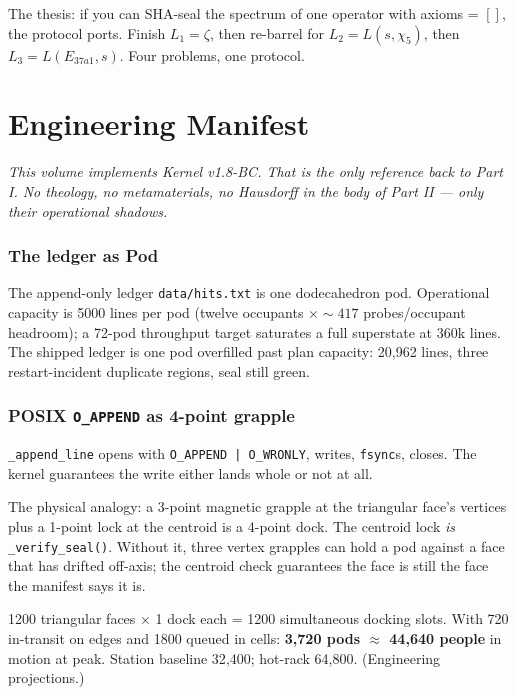 \documentclass[11pt,letterpaper]{article}
\begin{document}
The thesis: if you can SHA-seal the spectrum of one operator with axioms = $[]$, the protocol ports. Finish $L_1 = \zeta$, then re-barrel for $L_2 = L(s, \chi_5)$, then $L_3 = L(E_{37a1}, s)$. Four problems, one protocol.

\clearpage
\part{Engineering Manifest}
\label{part:engineering}

\textit{This volume implements Kernel v1.8-BC. That is the only reference
back to Part I. No theology, no metamaterials, no Hausdorff in the body
of Part II --- only their operational shadows.}

\section{The ledger as Pod}
\label{sec:ledger-pod}

The append-only ledger \texttt{data/hits.txt} is one dodecahedron pod.
Operational capacity is 5000 lines per pod (twelve occupants
$\times {\sim}417$ probes/occupant headroom); a 72-pod throughput target
saturates a full superstate at 360k lines. The shipped ledger is one
pod overfilled past plan capacity: 20,962 lines, three restart-incident
duplicate regions, seal still green.

\section{POSIX \texttt{O\_APPEND} as 4-point grapple}
\label{sec:grapple}

\texttt{\_append\_line} opens with \texttt{O\_APPEND | O\_WRONLY}, writes,
\texttt{fsync}s, closes. The kernel guarantees the write either lands
whole or not at all.

The physical analogy: a 3-point magnetic grapple at the triangular face's
vertices plus a 1-point lock at the centroid is a 4-point dock. The
centroid lock \emph{is} \texttt{\_verify\_seal()}. Without it, three
vertex grapples can hold a pod against a face that has drifted off-axis;
the centroid check guarantees the face is still the face the manifest
says it is.

1200 triangular faces $\times$ 1 dock each = 1200 simultaneous docking
slots. With 720 in-transit on edges and 1800 queued in cells:
\textbf{3{,}720 pods $\approx$ 44{,}640 people} in motion at peak.
Station baseline 32{,}400; hot-rack 64{,}800. (Engineering projections.)
\end{document}
